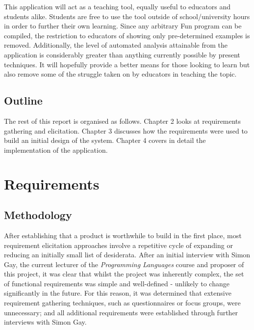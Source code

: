 \documentclass{l4proj}
\begin{document}
This application will act as a teaching tool, equally useful to educators and students alike. Students are free to use the tool outside of school/university hours in order to further their own learning. Since any arbitrary Fun program can be compiled, the restriction to educators of showing only pre-determined examples is removed. Additionally, the level of automated analysis attainable from the application is considerably greater than anything currently possible by present techniques. It will hopefully provide a better means for those looking to learn but also remove some of the struggle taken on by educators in teaching the topic.

\section{Outline}
The rest of this report is organised as follows. Chapter 2 looks at requirements gathering and elicitation. Chapter 3 discusses how the requirements were used to build an initial design of the system. Chapter 4 covers in detail the implementation of the application.

\chapter{Requirements}
\section{Methodology} 
After establishing that a product is worthwhile to build in the first place, most requirement elicitation approaches involve a repetitive cycle of expanding or reducing an initially small list of desiderata. After an initial interview with Simon Gay, the current lecturer of the {\it Programming Languages} course and proposer of this project, it was clear that whilst the project was inherently complex, the set of functional requirements was simple and well-defined - unlikely to change significantly in the future. For this reason, it was determined that extensive requirement gathering techniques, such as questionnaires or focus groups, were unnecessary; and all additional requirements were established through further interviews with Simon Gay.
\end{document}
